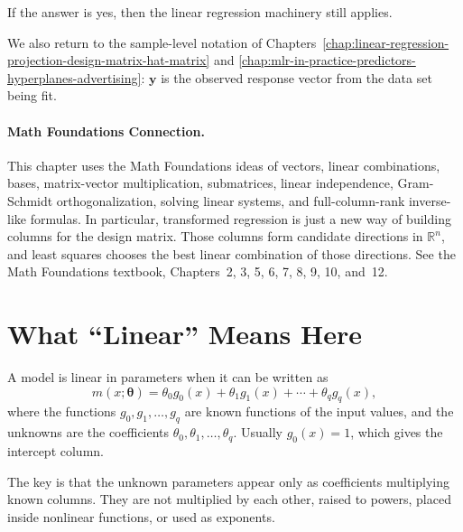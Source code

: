If the answer is yes, then the linear regression machinery still applies.

We also return to the sample-level notation of Chapters~\ref{chap:linear-regression-projection-design-matrix-hat-matrix} and \ref{chap:mlr-in-practice-predictors-hyperplanes-advertising}: \(\mathbf{y}\) is the observed response vector from the data set being fit.

\paragraph{Math Foundations Connection.}
This chapter uses the Math Foundations ideas of vectors, linear combinations, bases, matrix-vector multiplication, submatrices, linear independence, Gram-Schmidt orthogonalization, solving linear systems, and full-column-rank inverse-like formulas.  In particular, transformed regression is just a new way of building columns for the design matrix.  Those columns form candidate directions in \(\mathbb{R}^n\), and least squares chooses the best linear combination of those directions.  See the Math Foundations textbook, Chapters~2, 3, 5, 6, 7, 8, 9, 10, and~12.

\section{What ``Linear'' Means Here}

A model is linear in parameters when it can be written as
\begin{equation}
  m(x;\boldsymbol{\theta})
  =\theta_0 g_0(x)+\theta_1 g_1(x)+\cdots+\theta_q g_q(x),
  \label{eq:ch11-linear-in-parameters}
\end{equation}
where the functions \(g_0,g_1,\ldots,g_q\) are known functions of the input values, and the unknowns are the coefficients \(\theta_0,\theta_1,\ldots,\theta_q\).  Usually \(g_0(x)=1\), which gives the intercept column.

The key is that the unknown parameters appear only as coefficients multiplying known columns.  They are not multiplied by each other, raised to powers, placed inside nonlinear functions, or used as exponents.

